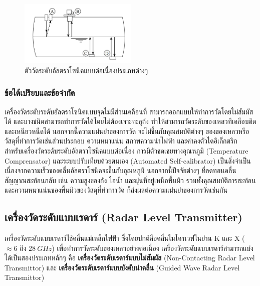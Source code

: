 \documentclass[final,11pt,a4paper]{article}
\begin{document}
\begin{figure}[H]
    \centering
    \includegraphics[width=0.5\textwidth]{images/Screenshot_26.jpg}
    \caption{ตัววัดระดับอัลตราโซนิคแบบต่อเนื่องประเภทต่างๆ}
    \label{fig:ulc}
\end{figure}

\subsubsection{ข้อได้เปรียบและข้อจำกัด}
เครื่องวัดระดับระดับอัลตราโซนิคแบบจุดไม่มีส่วนเคลื่อนที่ สามารถออกแบบให้ทำการวัดโดยไม่สัมผัสได้ และบางชนิดสามารถทำการวัดได้โดยไม่ต้องเจาะทะลุถ้ง 
ทำให้สามารถวัดระดับของเหลวทีเคลือบติด และเหนียวหนืดได้ นอกจากนี้ความแม่นยำของการวัด จะไม่ขึ้นกับคุณสมบัติต่างๆ 
ของของเหลวหรือวัสดุที่ทำการวัดเช่นส่วนประกอบ ความหนาแน่น สภาพความนำไฟฟ้า และค่าคงตัวไดอิเล็กตริก
สำหรับเครื่องวัดระดับระดับอัลตราโซนิคแบบต่อเนื่อง การมีตัวชดเชยทางอุณหภูมิ (Temperature Comprensator) และระบบปรับเทียบด้วยตนเอง 
(Automated Self-calibrator) เป็นสิ่งจำเป็น เนื่องจากความเร็วของคลื่นอัลตราโซนิคจะขึ้นกับอุณหภูมิ นอกจากนี้ปัจจัยต่างๆ ที่ลดทอนคลื่นสัญญาณสะท้อนกลับ
เช่น ความสูงของถัง ไอน้ำ และฝุ่นที่อยู่เหนือพื้นผิว รวมทั้งคุณสมบัติการสะท้อน และความหนาแน่นของพื้นผิวของวัสดุที่ทำการวัด ก็ส่งผลต่อความแม่นยำของการวัดเช่นกัน

\subsection{เครื่องวัดระดับแบบเรดาร์ (Radar Level Transmitter)}
เครื่องวัดระดับแบบเรดาร์ใช้คลื่นแม่เหล็กไฟฟ้า ซึ่งโดยปกติคือคลื่นไมโครเวฟในย่าน K และ X ($\approx 6$ ถึง $\SI{28}{GHz}$) 
เพื่อทำการวัดระดับของเหลวอย่างต่อเนื่อง เครื่องวัดระดับแบบเรดาร์สามารถแบ่งได้เป็นสองประเภทหลักๆ คือ \textbf{เครื่องวัดระดับเรดาร์แบบไม่สัมผัส}
(Non-Contacting Radar Level Transmittor) และ \textbf{เครื่องวัดระดับเรดาร์แบบบังคับนำคลื่น} (Guided Wave Radar Level Transmittor) 
\end{document}
